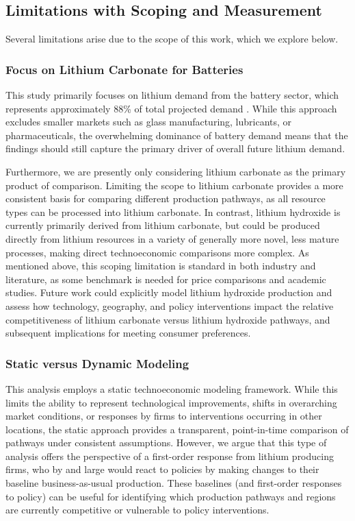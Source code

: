 \clearpage
\subsection{Limitations with Scoping and Measurement} \label{app:04-limitations}

Several limitations arise due to the scope of this work, which we explore below. 

\subsubsection{Focus on Lithium Carbonate for Batteries} \label{app:04-limitations-carbonate}

This study primarily focuses on lithium demand from the battery sector, which represents approximately 88\% of total projected demand \cite{usgeologicalsurveyMineralCommoditySummaries2026}. While this approach excludes smaller markets such as glass manufacturing, lubricants, or pharmaceuticals, the overwhelming dominance of battery demand means that the findings should still capture the primary driver of overall future lithium demand.

Furthermore, we are presently only considering lithium carbonate as the primary product of comparison. Limiting the scope to lithium carbonate provides a more consistent basis for comparing different production pathways, as all resource types can be processed into lithium carbonate. In contrast, lithium hydroxide is currently primarily derived from lithium carbonate, but could be produced directly from lithium resources in a variety of generally more novel, less mature processes, making direct technoeconomic comparisons more complex. As mentioned above, this scoping limitation is standard in both industry and literature, as some benchmark is needed for price comparisons and academic studies. Future work could explicitly model lithium hydroxide production and assess how technology, geography, and policy interventions impact the relative competitiveness of lithium carbonate versus lithium hydroxide pathways, and subsequent implications for meeting consumer preferences.

\subsubsection{Static versus Dynamic Modeling}\label{app:04-limitations-static}

This analysis employs a static technoeconomic modeling framework. While this limits the ability to represent technological improvements, shifts in overarching market conditions, or responses by firms to interventions occurring in other locations, the static approach provides a transparent, point-in-time comparison of pathways under consistent assumptions. However, we argue that this type of analysis offers the perspective of a first-order response from lithium producing firms, who by and large would react to policies by making changes to their baseline business-as-usual production. These baselines (and first-order responses to policy) can be useful for identifying which production pathways and regions are currently competitive or vulnerable to policy interventions.

